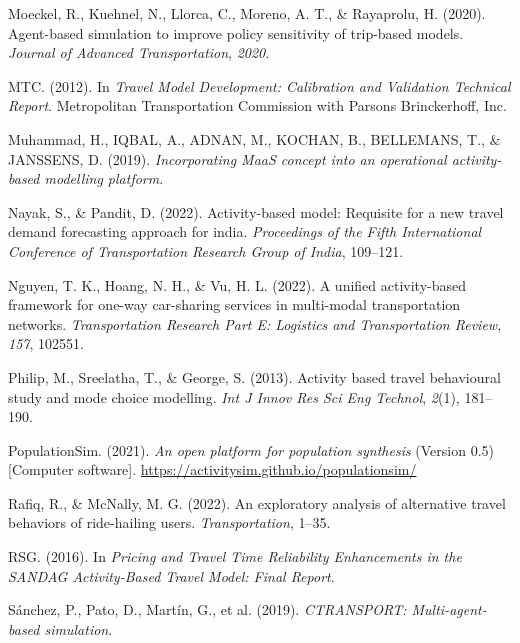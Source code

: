 \documentclass[fancy, masters]{byuthesis}
\newlength{\cslhangindent}
\newlength{\cslentryspacingunit} %
\newenvironment{CSLReferences}[2] %
 {%
  \setlength{\parindent}{0pt}
  \ifodd #1
  \let\oldpar\par
  \def\par{\hangindent=\cslhangindent\oldpar}
  \fi
  \setlength{\parskip}{#2\cslentryspacingunit}
 }%
 {}
\begin{document}
\begin{CSLReferences}{1}{0}
\leavevmode{}%
Moeckel, R., Kuehnel, N., Llorca, C., Moreno, A. T., \& Rayaprolu, H. (2020). Agent-based simulation to improve policy sensitivity of trip-based models. \emph{Journal of Advanced Transportation}, \emph{2020}.

\leavevmode{}%
MTC. (2012). In \emph{Travel Model Development: Calibration and Validation Technical Report}. Metropolitan Transportation Commission with Parsons Brinckerhoff, Inc.

\leavevmode{}%
Muhammad, H., IQBAL, A., ADNAN, M., KOCHAN, B., BELLEMANS, T., \& JANSSENS, D. (2019). \emph{Incorporating MaaS concept into an operational activity-based modelling platform}.

\leavevmode{}%
Nayak, S., \& Pandit, D. (2022). Activity-based model: Requisite for a new travel demand forecasting approach for india. \emph{Proceedings of the Fifth International Conference of Transportation Research Group of India}, 109--121.

\leavevmode{}%
Nguyen, T. K., Hoang, N. H., \& Vu, H. L. (2022). A unified activity-based framework for one-way car-sharing services in multi-modal transportation networks. \emph{Transportation Research Part E: Logistics and Transportation Review}, \emph{157}, 102551.

\leavevmode{}%
Philip, M., Sreelatha, T., \& George, S. (2013). Activity based travel behavioural study and mode choice modelling. \emph{Int J Innov Res Sci Eng Technol}, \emph{2}(1), 181--190.

\leavevmode{}%
PopulationSim. (2021). \emph{An open platform for population synthesis} (Version 0.5) {[}Computer software{]}. \url{https://activitysim.github.io/populationsim/}

\leavevmode{}%
Rafiq, R., \& McNally, M. G. (2022). An exploratory analysis of alternative travel behaviors of ride-hailing users. \emph{Transportation}, 1--35.

\leavevmode{}%
RSG. (2016). In \emph{Pricing and Travel Time Reliability Enhancements in the SANDAG Activity-Based Travel Model: Final Report}.

\leavevmode{}%
Sánchez, P., Pato, D., Martín, G., et al. (2019). \emph{CTRANSPORT: Multi-agent-based simulation}.


\end{CSLReferences}
\end{document}

